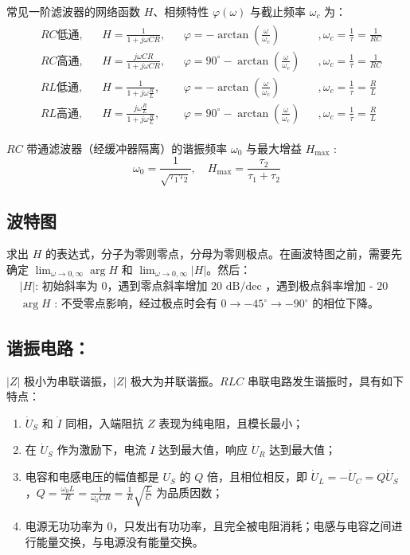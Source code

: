 \documentclass[a4paper]{article}  %
\theoremstyle{MyLineTheoremStyle} %
\theoremstyle{MyBlockTheoremStyle} %
\theoremstyle{MySubsubsectionStyle} %
\begin{document}
\begin{multicols*}{4}
常见一阶滤波器的网络函数 $H$、相频特性 $\varphi(\omega)$ 与截止频率 $\omega_c$ 为：
\begin{align*}
\begin{aligned}
&RC \text{低通}, && H = \frac{1}{1 + j \omega CR}, && \varphi = - \arctan \left(\frac{\omega}{\omega_c}\right) &&, \omega_c = \frac{1}{\tau} = \frac{1}{RC}\\
&RC \text{高通}, && H = \frac{j \omega CR}{1 + j \omega CR}, && \varphi = 90^\circ - \arctan \left(\frac{\omega}{\omega_c}\right) &&, \omega_c = \frac{1}{\tau} = \frac{1}{RC}\\
&RL \text{低通}, && H = \frac{1}{1 + j \omega \frac{R}{L}}, && \varphi = - \arctan \left(\frac{\omega}{\omega_c}\right) &&, \omega_c = \frac{1}{\tau} = \frac{R}{L}\\
&RL \text{高通}, && H = \frac{j \omega \frac{R}{L}}{1 + j \omega \frac{R}{L}}, && \varphi = 90^\circ - \arctan \left(\frac{\omega}{\omega_c}\right) &&, \omega_c = \frac{1}{\tau} = \frac{R}{L}
\end{aligned}
\end{align*}

$RC$ 带通滤波器（经缓冲器隔离）的谐振频率 $\omega_0$ 与最大增益 $H_{\max}$ : 
\begin{equation}
\omega_0 = \frac{1}{\sqrt{\tau_1 \tau_2}},\quad 
H_{\max} = \frac{\tau_2}{\tau_1 + \tau_2}
\end{equation}

\subsection{波特图}
求出 $H$ 的表达式，分子为零则零点，分母为零则极点。在画波特图之前，需要先确定 $\lim_{\omega \to 0, \infty} \arg H$ 和  $\lim_{\omega \to 0, \infty} |H|$。然后：
\begin{align}
&\text{$|H|$: 初始斜率为 0，遇到零点斜率增加 20 dB/dec ，遇到极点斜率增加 - 20 dB/dec ；} \\ 
& \text{$\arg H$ : 不受零点影响，经过极点时会有  $0 \to  -45^\circ \to -90^\circ$ 的相位下降。}
\end{align}

\subsection{谐振电路：}

$|Z|$ 极小为串联谐振，$|Z|$ 极大为并联谐振。$RLC$ 串联电路发生谐振时，具有如下特点：
\begin{enumerate}
\item $\dot{U}_S$ 和 $\dot{I}$ 同相，入端阻抗 $Z$ 表现为纯电阻，且模长最小；
\item 在 $\dot{U}_S$ 作为激励下，电流 $\dot{I}$ 达到最大值，响应 $\dot{U}_R$ 达到最大值；
\item 电容和电感电压的幅值都是 $U_S$ 的 $Q$ 倍，且相位相反，即 $\dot{U}_L = -\dot{U}_C = Q \dot{U}_S$，$Q = \frac{\omega_0 L}{R} = \frac{1}{\omega_0 CR} = \frac{1}{R}\sqrt{\frac{L}{C}}$ 为品质因数；
\item 电源无功功率为 0，只发出有功功率，且完全被电阻消耗；电感与电容之间进行能量交换，与电源没有能量交换。
\end{enumerate}



\end{multicols*}
\end{document}
